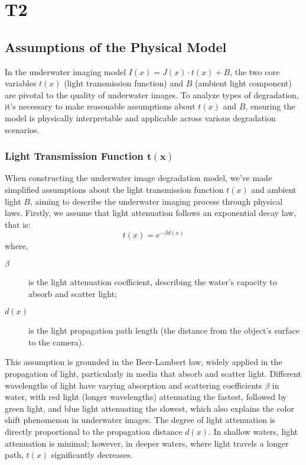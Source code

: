 \documentclass[11pt]{ctexart}
\begin{document}
    \section{T2}

    \subsection{Assumptions of the Physical Model}
    In the underwater imaging model \( I(x) = J(x) \cdot t(x) + B \),
    the two core variables \( t(x) \) (light transmission function) and \( B \) (ambient light component) are pivotal to the quality of underwater images.
    To analyze types of degradation, it's necessary to make reasonable assumptions about \( t(x) \) and \( B \), ensuring the model is physically interpretable and applicable across various degradation scenarios.

    \subsubsection{Light Transmission Function \( \boldsymbol{t(x)} \)}
    When constructing the underwater image degradation model, we've made simplified assumptions about the light transmission function \( t(x) \) and ambient light \( B \), aiming to describe the underwater imaging process through physical laws.
    Firstly, we assume that light attenuation follows an exponential decay law, that is:
    \[ t(x) = e^{-\beta d(x)} \]
    where,
    \begin{description}
        \item [$\beta$] is the light attenuation coefficient, describing the water's capacity to absorb and scatter light;
        \item [$d(x)$] is the light propagation path length (the distance from the object's surface to the camera).
    \end{description}
    This assumption is grounded in the Beer-Lambert law, widely applied in the propagation of light, particularly in media that absorb and scatter light.
    Different wavelengths of light have varying absorption and scattering coefficients \( \beta \) in water, with red light (longer wavelengths) attenuating the fastest, followed by green light, and blue light attenuating the slowest,
    which also explains the color shift phenomenon in underwater images.
    The degree of light attenuation is directly proportional to the propagation distance \( d(x) \). In shallow waters, light attenuation is minimal; however, in deeper waters, where light travels a longer path, \( t(x) \) significantly decreases.
\end{document}
